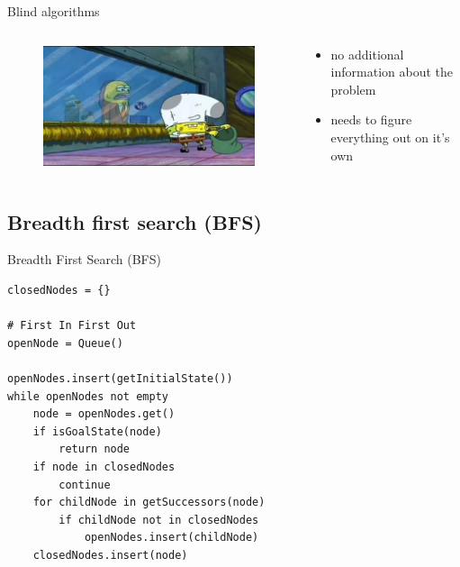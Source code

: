 \documentclass{beamer}
\begin{document}
\begin{frame}{Blind algorithms}

	\begin{columns}[T]
	
		\begin{column}{.48\textwidth}
			\begin{figure}
			\centering
				\includegraphics[width=\linewidth]{spongebob_blind.jpg}
			\end{figure}
		\end{column}
		
		\begin{column}{.48\textwidth}
		
			\begin{itemize}
				\item no additional information about the problem
				\item needs to figure everything out on it's own
			\end{itemize}
		
		\end{column}
	
	\end{columns}

\end{frame}

\subsection{Breadth first search (BFS)}

\begin{frame}[fragile]{Breadth First Search (BFS)}
	\begin{lstlisting}
closedNodes = {}

# First In First Out
openNode = Queue()

openNodes.insert(getInitialState())
while openNodes not empty 
	node = openNodes.get()
	if isGoalState(node)
		return node
	if node in closedNodes
		continue				
	for childNode in getSuccessors(node)
		if childNode not in closedNodes
			openNodes.insert(childNode)
	closedNodes.insert(node)
	\end{lstlisting}
\end{frame}
\end{document}
